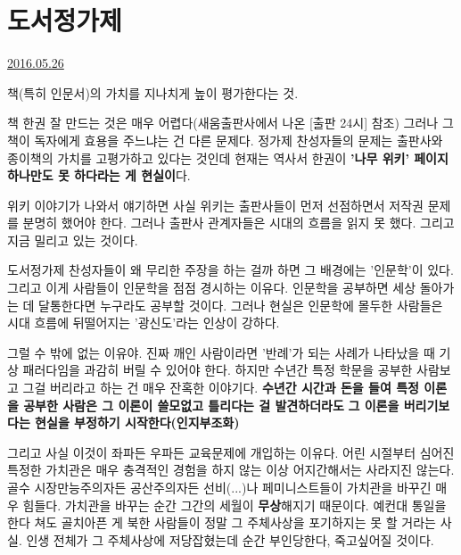 





\section{도서정가제}
\href{https://www.kockoc.com/Apoc/793149}{2016.05.26}

\vspace{5mm}

책(특히 인문서)의 가치를 지나치게 높이 평가한다는 것.
\vspace{5mm}

책 한권 잘 만드는 것은 매우 어렵다(새움출판사에서 나온 [출판 24시] 참조)
그러나 그 책이 독자에게 효용을 주느냐는 건 다른 문제다.
정가제 찬성자들의 문제는 출판사와 종이책의 가치를 고평가하고 있다는 것인데
현재는 역사서 한권이 \textbf{'나무 위키' 페이지 하나만도 못 하다라는 게 현실이}다.
\vspace{5mm}

위키 이야기가 나와서 얘기하면 사실 위키는 출판사들이 먼저 선점하면서 저작권 문제를 분명히 했어야 한다.
그러나 출판사 관계자들은 시대의 흐름을 읽지 못 했다. 그리고 지금 밀리고 있는 것이다.
\vspace{5mm}

도서정가제 찬성자들이 왜 무리한 주장을 하는 걸까 하면 그 배경에는 '인문학'이 있다.
그리고 이게 사람들이 인문학을 점점 경시하는 이유다.
인문학을 공부하면 세상 돌아가는 데 달통한다면 누구라도 공부할 것이다.
그러나 현실은 인문학에 몰두한 사람들은 시대 흐름에 뒤떨어지는 '광신도'라는 인상이 강하다.
\vspace{5mm}

그럴 수 밖에 없는 이유야.
진짜 깨인 사람이라면 '반례'가 되는 사례가 나타났을 때 기상 패러다임을 과감히 버릴 수 있어야 한다.
하지만 수년간 특정 학문을 공부한 사람보고 그걸 버리라고 하는 건 매우 잔혹한 이야기다.
\textbf{수년간 시간과 돈을 들여 특정 이론을 공부한 사람은 그 이론이 쓸모없고 틀리다는 걸 발견하더라도}
\textbf{그 이론을 버리기보다는 현실을 부정하기 시작한다(인지부조화)}
\vspace{5mm}

그리고 사실 이것이 좌파든 우파든 교육문제에 개입하는 이유다.
어린 시절부터 심어진 특정한 가치관은 매우 충격적인 경험을 하지 않는 이상 어지간해서는 사라지진 않는다.
골수 시장만능주의자든 공산주의자든 선비(...)나 페미니스트들이 가치관을 바꾸긴 매우 힘들다.
가치관을 바꾸는 순간 그간의 세월이 \textbf{무상}해지기 때문이다.
예컨대 통일을 한다 쳐도 골치아픈 게 북한 사람들이 정말 그 주체사상을 포기하지는 못 할 거라는 사실.
인생 전체가 그 주체사상에 저당잡혔는데 순간 부인당한다, 죽고싶어질 것이다.
\vspace{5mm}

